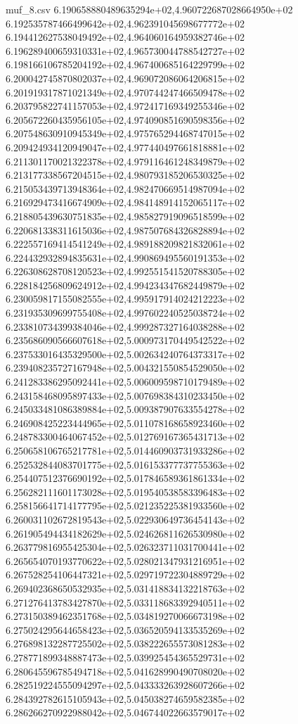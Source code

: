 \begin{filecontents*}{muf_8.csv}
6.190658880489635294e+02,4.960722687028664950e+02
6.192535787466499642e+02,4.962391045698677772e+02
6.194412627538049492e+02,4.964060164959382746e+02
6.196289400659310331e+02,4.965730044788542727e+02
6.198166106785204192e+02,4.967400685164229799e+02
6.200042745870802037e+02,4.969072086064206815e+02
6.201919317871021349e+02,4.970744247466509478e+02
6.203795822741157053e+02,4.972417169349255346e+02
6.205672260435956105e+02,4.974090851690598356e+02
6.207548630910945349e+02,4.975765294468747015e+02
6.209424934120949047e+02,4.977440497661818881e+02
6.211301170021322378e+02,4.979116461248349879e+02
6.213177338567204515e+02,4.980793185206530325e+02
6.215053439713948364e+02,4.982470669514987094e+02
6.216929473416674909e+02,4.984148914152065117e+02
6.218805439630751835e+02,4.985827919096518599e+02
6.220681338311615036e+02,4.987507684326828894e+02
6.222557169414541249e+02,4.989188209821832061e+02
6.224432932894835631e+02,4.990869495560191353e+02
6.226308628708120523e+02,4.992551541520788305e+02
6.228184256809624912e+02,4.994234347682449879e+02
6.230059817155082555e+02,4.995917914024212223e+02
6.231935309699755408e+02,4.997602240525038724e+02
6.233810734399384046e+02,4.999287327164038288e+02
6.235686090566607618e+02,5.000973170449542522e+02
6.237533016435329500e+02,5.002634240764373317e+02
6.239408235727167948e+02,5.004321550854529050e+02
6.241283386295092441e+02,5.006009598710179489e+02
6.243158468095897433e+02,5.007698384310233450e+02
6.245033481086389884e+02,5.009387907633554278e+02
6.246908425223444965e+02,5.011078168658923460e+02
6.248783300464067452e+02,5.012769167365431713e+02
6.250658106765217781e+02,5.014460903731933286e+02
6.252532844083701775e+02,5.016153377737755363e+02
6.254407512376690192e+02,5.017846589361861334e+02
6.256282111601173028e+02,5.019540538583396483e+02
6.258156641714177795e+02,5.021235225381933560e+02
6.260031102672819543e+02,5.022930649736454143e+02
6.261905494434182629e+02,5.024626811626530980e+02
6.263779816955425304e+02,5.026323711031700441e+02
6.265654070193770622e+02,5.028021347931216951e+02
6.267528254106447321e+02,5.029719722304889729e+02
6.269402368650532935e+02,5.031418834132218763e+02
6.271276413783427870e+02,5.033118683392940511e+02
6.273150389462351768e+02,5.034819270066673198e+02
6.275024295644658423e+02,5.036520594133535269e+02
6.276898132287725502e+02,5.038222655573081283e+02
6.278771899348887473e+02,5.039925454365529731e+02
6.280645596785494718e+02,5.041628990490708020e+02
6.282519224555094297e+02,5.043333263928607266e+02
6.284392782615105943e+02,5.045038274659582385e+02
6.286266270922988042e+02,5.046744022663579017e+02

\end{filecontents*}
